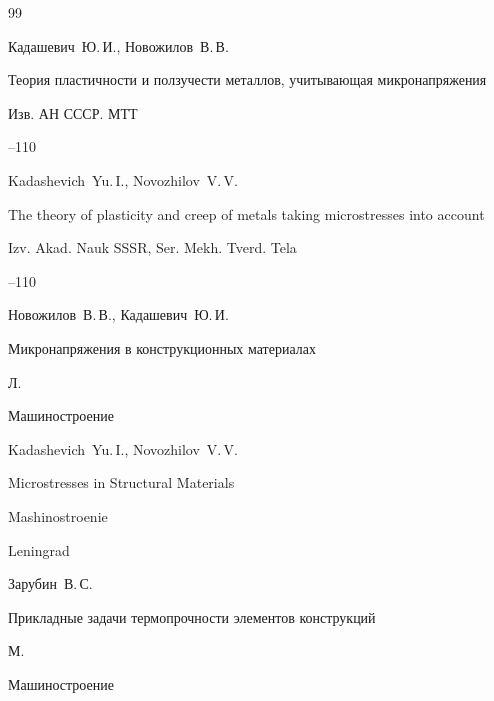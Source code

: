 \begin{thebibliography}{99}




\by Кадашевич~Ю.\,И., Новожилов~В.\,В.

\paper Теория пластичности и ползучести металлов, учитывающая микронапряжения

\jour Изв. АН СССР. МТТ



--110

\misctransl

\by Kadashevich~Yu.\,I., Novozhilov~V.\,V.

\paper The theory of plasticity and creep of metals taking microstresses into account

\jour Izv. Akad. Nauk SSSR, Ser. Mekh. Tverd. Tela


–110 





\by Новожилов~В.\,В., Кадашевич~Ю.\,И.

\book Микронапряжения в конструкционных материалах

\publaddr Л.

\publ Машиностроение



\misctransl

\by Kadashevich~Yu.\,I., Novozhilov~V.\,V.

\book Microstresses in Structural Materials 

\publ Mashinostroenie

\publaddr Leningrad






\by Зарубин~В.\,С.

\book Прикладные задачи термопрочности элементов конструкций

\publaddr М.

\publ Машиностроение



\misctransl


\end{thebibliography}
